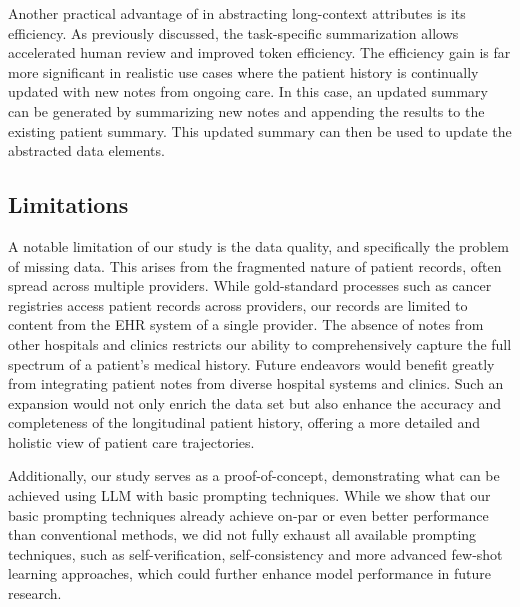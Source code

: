 Another practical advantage of \ours in abstracting long-context attributes is its efficiency. As previously discussed, the task-specific summarization allows accelerated human review and improved token efficiency. The efficiency gain is far more significant in realistic use cases where the patient history is continually updated with new notes from ongoing care. In this case, an updated summary can be generated by summarizing new notes and appending the results to the existing patient summary. This updated summary can then be used to update the abstracted data elements.



\subsection{Limitations}
A notable limitation of our study is the data quality, and specifically the problem of missing data. This arises from the fragmented nature of patient records, often spread across multiple providers. While gold-standard processes such as cancer registries access patient records across providers, our records are limited to content from the EHR system of a single provider. The absence of notes from other hospitals and clinics restricts our ability to comprehensively capture the full spectrum of a patient's medical history. Future endeavors would benefit greatly from integrating patient notes from diverse hospital systems and clinics. Such an expansion would not only enrich the data set but also enhance the accuracy and completeness of the longitudinal patient history, offering a more detailed and holistic view of patient care trajectories. 

Additionally, our study serves as a proof-of-concept, demonstrating what can be achieved using LLM with basic prompting techniques. While we show that our basic prompting techniques already achieve on-par or even better performance than conventional methods, we did not fully exhaust all available prompting techniques, such as self-verification, self-consistency and more advanced few-shot learning approaches, which could further enhance model performance in future research.








